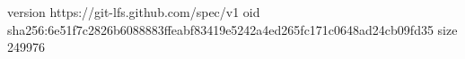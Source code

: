 version https://git-lfs.github.com/spec/v1
oid sha256:6e51f7c2826b6088883ffeabf83419e5242a4ed265fc171c0648ad24cb09fd35
size 249976
